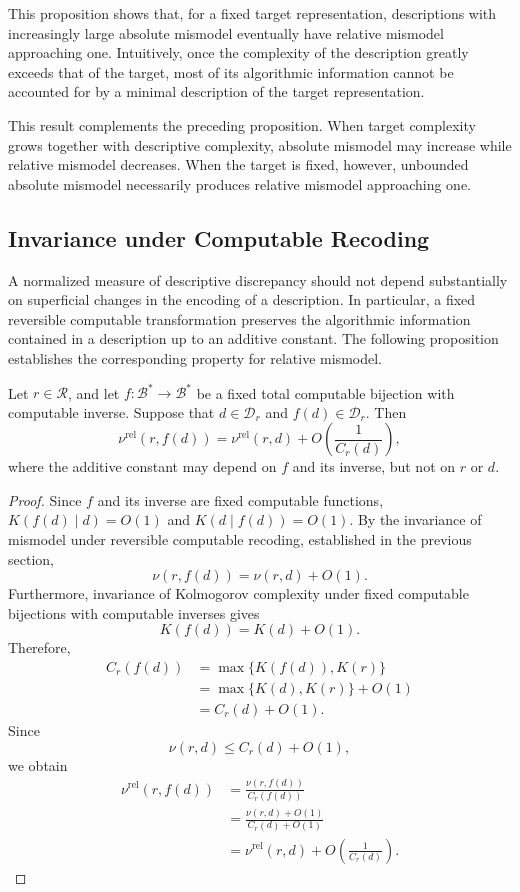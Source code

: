 This proposition shows that, for a fixed target representation, descriptions with increasingly large absolute mismodel eventually have relative mismodel approaching one. Intuitively, once the complexity of the description
greatly exceeds that of the target, most of its algorithmic information cannot be accounted for by a minimal description of the target representation.

This result complements the preceding proposition. When target complexity grows together with descriptive complexity, absolute mismodel may increase while relative mismodel decreases. When the target is fixed, however, unbounded absolute mismodel necessarily produces relative mismodel approaching one.


\subsection*{Invariance under Computable Recoding}

A normalized measure of descriptive discrepancy should not depend substantially on superficial changes in the encoding of a description. In particular, a fixed reversible computable transformation preserves the algorithmic information contained in a description up to an additive constant. The following proposition establishes the corresponding property for relative mismodel.

\begin{proposition}
\label{prop:relative_mismodel_recoding}
Let $r\in\mathcal R$, and let $f:\mathcal B^\ast\to\mathcal B^\ast$ be a fixed total computable bijection with
computable inverse. Suppose that $d\in\mathcal D_r$ and $f(d)\in\mathcal D_r$. Then
\[
\nu^{\mathrm{rel}}(r,f(d)) = \nu^{\mathrm{rel}}(r,d) + O\left(\frac{1}{C_r(d)}\right),
\]
where the additive constant may depend on $f$ and its inverse, but not on $r$ or $d$.
\end{proposition}
\begin{proof}
Since $f$ and its inverse are fixed computable functions, $K(f(d)\mid d)=O(1)$ and $K(d\mid f(d))=O(1)$. By the invariance of mismodel under reversible computable recoding, established in the previous section,
\[
\nu(r,f(d))=\nu(r,d)+O(1).
\]
Furthermore, invariance of Kolmogorov complexity under fixed computable bijections with computable inverses gives
\[
K(f(d))=K(d)+O(1).
\]
Therefore,
\[
\begin{aligned}
C_r(f(d))
& = \max\{K(f(d)),K(r)\}\\
& = \max\{K(d),K(r)\}+O(1)\\
& = C_r(d)+O(1).
\end{aligned}
\]
Since
\[
\nu(r,d)\le C_r(d)+O(1),
\]
we obtain
\[
\begin{aligned}
\nu^{\mathrm{rel}}(r,f(d))
& = \frac{\nu(r,f(d))}{C_r(f(d))}\\
& = \frac{\nu(r,d)+O(1)}{C_r(d)+O(1)}\\
& = \nu^{\mathrm{rel}}(r,d) + O\left(\frac{1}{C_r(d)}\right).
\end{aligned}
\]
\end{proof}


